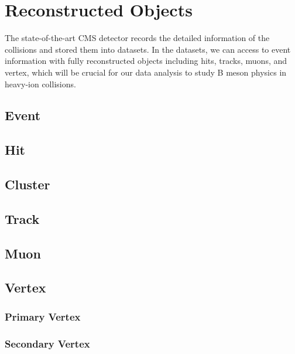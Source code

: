 \chapter{Reconstructed Objects}

The state-of-the-art CMS detector records the detailed information of the collisions and stored them into datasets. In the datasets, we can access to event information with fully reconstructed objects including hits, tracks, muons, and vertex, which will be crucial for our data analysis to study B meson physics in heavy-ion collisions.

\section{Event}

\section{Hit}

\section{Cluster}

\section{Track}

\section{Muon}

\section{Vertex}

\subsection{Primary Vertex}

\subsection{Secondary Vertex}

